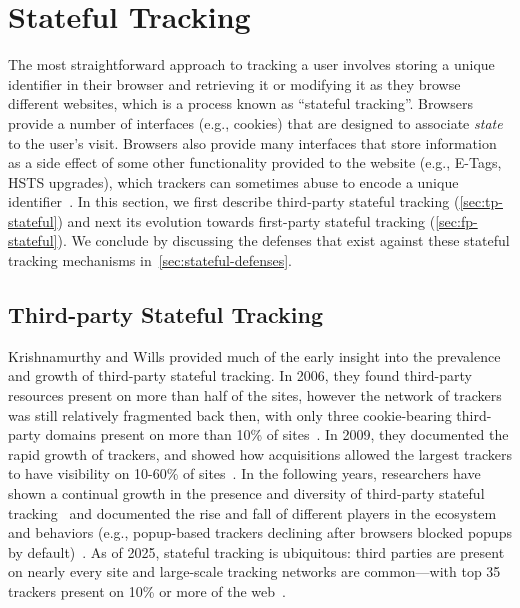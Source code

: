 \section{Stateful Tracking}
\label{sec:stateful-tracking}
The most straightforward approach to tracking a user involves storing a unique identifier in their browser and retrieving it or modifying it as they browse different websites, which is a process known as ``stateful tracking''. 
%
Browsers provide a number of interfaces (e.g., cookies) that are designed to associate \textit{state} to the user's visit. 
%
Browsers also provide many interfaces that store information as a side effect of some other functionality provided to the website (e.g., E-Tags, HSTS upgrades), which trackers can sometimes abuse to encode a unique identifier~\cite{englehardtAutomatedDiscoveryPrivacy2018,ashkansoltaniFlashCookiesPrivacy2011,solomosTalesFaviconsCaches2021}.
%
In this section, we first describe third-party stateful tracking (\autoref{sec:tp-stateful}) and next its evolution towards first-party stateful tracking (\autoref{sec:fp-stateful}).
%
We conclude by discussing the defenses that exist against these stateful tracking mechanisms in~\autoref{sec:stateful-defenses}.

\subsection{Third-party Stateful Tracking}
\label{sec:tp-stateful}

Krishnamurthy and Wills provided much of the early insight into the prevalence and growth of third-party stateful tracking. 
%
In 2006, they found third-party resources present on more than half of the sites, however the network of trackers was still relatively fragmented back then, with only three cookie-bearing third-party domains present on more than 10\% of sites~\cite{krishnamurthyGeneratingPrivacyFootprint2006}. 
%
In 2009, they documented the rapid growth of trackers, and showed how acquisitions allowed the largest trackers to have visibility on 10-60\% of sites~\cite{krishnamurthyPrivacyDiffusionWeb2009}. 
%
In the following years, researchers have shown a continual growth in the presence and diversity of third-party stateful tracking~\cite{soltaniFlashCookiesPrivacy2009,roesnerDetectingDefendingThirdparty2012,mayerThirdPartyWebTracking2012,acarFPDetectiveDustingWeb2013,eubankShiningFloodlightsMobile2013, altaweelWebPrivacyCensus2015,englehardtOnlineTracking1millionsite2016,lernerInternetJonesRaiders2016,schelterUbiquityWebTracking2018} and documented the rise and fall of different players in the ecosystem and behaviors (e.g., popup-based trackers declining after browsers blocked popups by default)~\cite{lernerInternetJonesRaiders2016}.
%
As of 2025, stateful tracking is ubiquitous: third parties are present on nearly every site and large-scale tracking networks are common---with top 35 trackers present on 10\% or more of the web~\cite{duckduckgoTrackerRadarWiki2024}.



